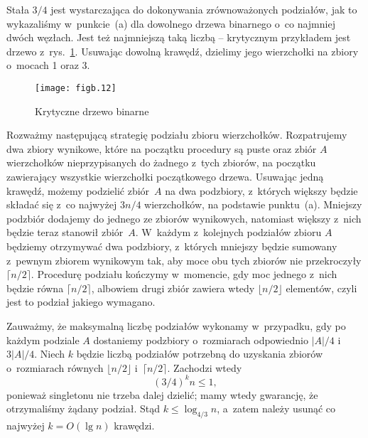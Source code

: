 \subproblem %
Stała $3/4$ jest wystarczająca do dokonywania zrównoważonych podziałów, jak to wykazaliśmy w~punkcie~(a) dla dowolnego drzewa binarnego o~co najmniej dwóch węzłach. Jest też najmniejszą taką liczbą -- krytycznym przykładem jest drzewo z~rys.~\ref{fig:B-3b}. Usuwając dowolną krawędź, dzielimy jego wierzchołki na zbiory o~mocach 1 oraz 3.
\begin{figure}[ht]
	\begin{center}
		\texttt{[image: figb.12]}
	\end{center}
	\caption{Krytyczne drzewo binarne} \label{fig:B-3b}
\end{figure}

\subproblem %
Rozważmy następującą strategię podziału zbioru wierzchołków. Rozpatrujemy dwa zbiory wynikowe, które na początku procedury są puste oraz zbiór $A$ wierzchołków nieprzypisanych do żadnego z~tych zbiorów, na początku zawierający wszystkie wierzchołki początkowego drzewa. Usuwając jedną krawędź, możemy podzielić  zbiór~$A$ na dwa podzbiory, z~których większy będzie składać się z~co najwyżej $3n/4$ wierzchołków, na podstawie punktu~(a). Mniejszy podzbiór dodajemy do jednego ze zbiorów wynikowych, natomiast większy z~nich będzie teraz stanowił zbiór~$A$. W~każdym z~kolejnych podziałów zbioru $A$ będziemy otrzymywać dwa podzbiory, z~których mniejszy będzie sumowany z~pewnym zbiorem wynikowym tak, aby moce obu tych zbiorów nie przekroczyły $\lceil n/2\rceil$. Procedurę podziału kończymy w~momencie, gdy moc jednego z~nich będzie równa $\lceil n/2\rceil$, albowiem drugi zbiór zawiera wtedy $\lfloor n/2\rfloor$ elementów, czyli jest to podział jakiego wymagano.

Zauważmy, że maksymalną liczbę podziałów wykonamy w~przypadku, gdy po każdym podziale $A$ dostaniemy podzbiory o~rozmiarach odpowiednio $|A|/4$ i~$3|A|/4$. Niech $k$ będzie liczbą podziałów potrzebną do uzyskania zbiorów o~rozmiarach równych $\lfloor n/2\rfloor$ i~$\lceil n/2\rceil$. Zachodzi wtedy
\[
	(3/4)^kn \le 1,
\]
ponieważ singletonu nie trzeba dalej dzielić; mamy wtedy gwarancję, że otrzymaliśmy żądany podział. Stąd $k\le\log_{4/3}n$, a~zatem należy usunąć co najwyżej $k=O(\lg n)$ krawędzi.

\endinput
